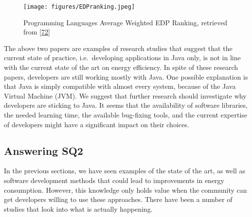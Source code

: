 \documentclass[]{book}
\begin{document}
\begin{figure}
\centering
\texttt{[image: figures/EDPranking.jpeg]}
\caption{Programming Languages Average Weighted EDP Ranking, retrieved
from {[}\protect\hyperlink{ref-GKLS2018}{72}{]}}
\end{figure}

The above two papers are examples of research studies that suggest that
the current state of practice, i.e.~developing applications in Java
only, is not in line with the current state of the art on energy
efficiency. In spite of these research papers, developers are still
working mostly with Java. One possible explanation is that Java is
simply compatible with almost every system, because of the Java Virtual
Machine (JVM). We suggest that further research should investigate why
developers are sticking to Java. It seems that the availability of
software libraries, the needed learning time, the available bug-fixing
tools, and the current expertise of developers might have a significant
impact on their choices.

\subsection{Answering SQ2}\label{answering-sq2}

In the previous sections, we have seen examples of the state of the art,
as well as software development methods that could lead to improvements
in energy consumption. However, this knowledge only holds value when the
community can get developers willing to use these approaches. There have
been a number of studies that look into what is actually happening.
\end{document}

